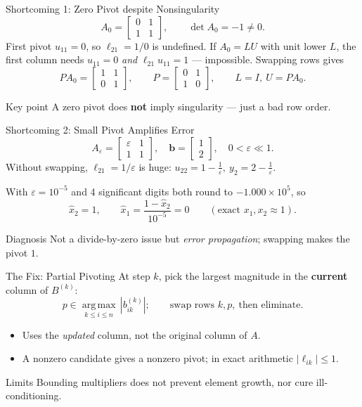 \documentclass[11pt,aspectratio=169]{beamer}
\newcommand{\mat}[1]{\begin{bmatrix}#1\end{bmatrix}}
\begin{document}
\begin{frame}{Shortcoming 1: Zero Pivot despite Nonsingularity}
  \small
  \[
    A_0=\mat{0&1\\1&1},\qquad \det A_0=-1\neq0.
  \]
  First pivot $u_{11}=0$, so $\ell_{21}=1/0$ is undefined. If $A_0=LU$ with unit
  lower $L$, the first column needs $u_{11}=0$ \emph{and} $\ell_{21}u_{11}=1$ --- impossible.
  Swapping rows gives
  \[
    PA_0=\mat{1&1\\0&1},\qquad P=\mat{0&1\\1&0},\qquad L=I,\ U=PA_0.
  \]
  \begin{alertblock}{Key point}
    A zero pivot does \textbf{not} imply singularity --- just a bad row order.
  \end{alertblock}
\end{frame}

\begin{frame}{Shortcoming 2: Small Pivot Amplifies Error}
  \[
    A_\varepsilon=\mat{\varepsilon&1\\1&1},\quad \mathbf{b}=\mat{1\\2},\quad 0<\varepsilon\ll1.
  \]
  Without swapping, $\ell_{21}=1/\varepsilon$ is huge:
  $u_{22}=1-\tfrac1\varepsilon,\ y_2=2-\tfrac1\varepsilon$.
  \medskip

  With $\varepsilon=10^{-5}$ and 4 significant digits both round to $-1.000\times10^{5}$, so
  \[
    \widehat x_2=1,\qquad \widehat x_1=\frac{1-\widehat x_2}{10^{-5}}=0
    \qquad(\text{exact } x_1,x_2\approx1).
  \]
  \begin{block}{Diagnosis}
    Not a divide-by-zero issue but \emph{error propagation}; swapping makes the pivot $1$.
  \end{block}
\end{frame}

\begin{frame}{The Fix: Partial Pivoting}
  At step $k$, pick the largest magnitude in the \textbf{current} column of $B^{(k)}$:
  \[
    p\in\underset{k\le i\le n}{\operatorname{arg\,max}}\,|b^{(k)}_{ik}|;
    \qquad \text{swap rows } k,p,\ \text{then eliminate.}
  \]
  \begin{itemize}
    \item Uses the \emph{updated} column, not the original column of $A$.
    \item A nonzero candidate gives a nonzero pivot; in exact arithmetic $|\ell_{ik}|\le1$.
  \end{itemize}
  \begin{alertblock}{Limits}
    Bounding multipliers does not prevent element growth, nor cure ill-conditioning.
  \end{alertblock}
\end{frame}
\end{document}
